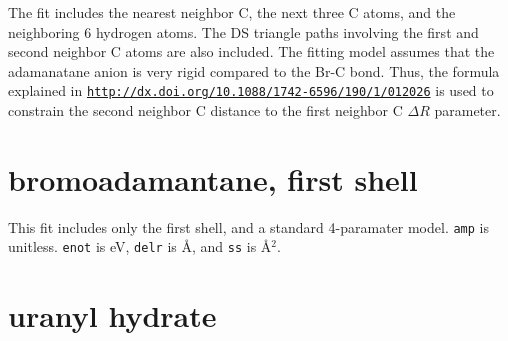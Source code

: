 \documentclass{article}
\let\stdsection\section
\renewcommand\section{\newpage\stdsection}
\begin{document}
The fit includes the nearest neighbor C, the next three C atoms, and
the neighboring 6 hydrogen atoms.  The DS triangle paths involving the
first and second neighbor C atoms are also included.  The fitting
model assumes that the adamanatane anion is very rigid compared to the
Br-C bond.  Thus, the formula explained in 
\href{http://dx.doi.org/10.1088/1742-6596/190/1/012026}%
{\texttt{http://dx.doi.org/10.1088/1742-6596/190/1/012026}} is used to
constrain the second neighbor C distance to the first neighbor C
$\Delta R$ parameter.



\def\feffmaterial{bromoadamantane}
\def\feffrone{8}
\def\fefffirst{}

\small

\fitthreeplots


\section{bromoadamantane, first shell}
\normalsize

This fit includes only the first shell, and a standard 4-paramater
model.  \texttt{amp} is unitless.  \texttt{enot} is eV, \texttt{delr}
is \AA, and \texttt{ss} is \AA$^2$.

\def\fefffirst{_1st}

\small

\fitthreeplots







\section{uranyl hydrate}
\normalsize
\end{document}
